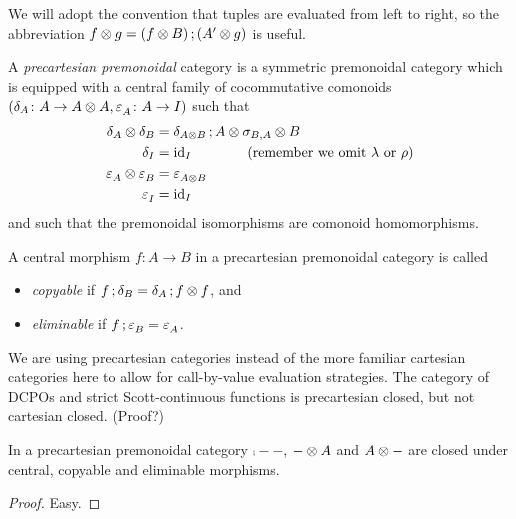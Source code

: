 \documentclass[runningheads,envcountsame]{llncs}
\begin{document}
We will adopt the convention that tuples are evaluated from left to right, so the abbreviation $\tensor{f}{g} = \comp{(\tensor{f}{B})}{(\tensor{A'}{g})}$ is useful.

\begin{definition}
    A \emph{precartesian premonoidal} category is a symmetric premonoidal category which is equipped with a central family of cocommutative comonoids $(\dup_{A}\colon A \to \tensor{A}{A}, \terminal_{A}\colon A \to I)$ such that 
    \begin{align}
        \tensor{\dup_A}{\dup_B} &= \comp{\dup_{\tensor{A}{B}}}{\tensor{A}{\tensor{\swap_{B, A}}{B}}} \\
        \dup_I &= \id_I \qquad\qquad \text{(remember we omit $\unitl$ or $\unitr$)} \\
        \tensor{\terminal_A}{\terminal_B} &= \terminal_{\tensor{A}{B}} \\
        \terminal_I &= \id_I
    \end{align}
    and such that the premonoidal isomorphisms are comonoid homomorphisms.
    
    A central morphism $f\colon A \to B$ in a precartesian premonoidal category is called
    \begin{itemize}
        \item \emph{copyable} if $\comp{f}{\dup_B} = \comp{\dup_A}{\tensor{f}{f}}$, and
        \item \emph{eliminable} if $\comp{f}{\terminal_B} = \terminal_A$.
    \end{itemize}
\end{definition}
    
\begin{remark}
    We are using precartesian categories instead of the more familiar cartesian categories here to allow for call-by-value evaluation strategies. The category of DCPOs and strict Scott-continuous functions is precartesian closed, but not cartesian closed. (Proof?)
\end{remark}

\begin{lemma}
    In a precartesian premonoidal category $\comp{-}{-}$, $\tensor{-}{A}$ and $\tensor{A}{-}$ are closed under central, copyable and eliminable morphisms.
\end{lemma}
\begin{proof}
    Easy.
\end{proof}
\end{document}
